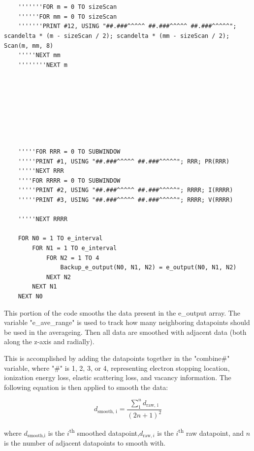 \documentclass[10pt, reqno]{exam}
\begin{document}
\begin{verbatim}
    
    
    '''''''FOR m = 0 TO sizeScan
    ''''''FOR mm = 0 TO sizeScan
    '''''''PRINT #12, USING "##.###^^^^^ ##.###^^^^^ ##.###^^^^^"; scandelta * (m - sizeScan / 2); scandelta * (mm - sizeScan / 2); Scan(m, mm, 8)
    '''''NEXT mm
    ''''''''NEXT m
    
    
    
    
    
    
    
    
    '''''FOR RRR = 0 TO SUBWINDOW
    '''''PRINT #1, USING "##.###^^^^^ ##.###^^^^^"; RRR; PR(RRR)
    '''''NEXT RRR
    ''''FOR RRRR = 0 TO SUBWINDOW
    '''''PRINT #2, USING "##.###^^^^^ ##.###^^^^^"; RRRR; I(RRRR)
    '''''PRINT #3, USING "##.###^^^^^ ##.###^^^^^"; RRRR; V(RRRR)
    
    '''''NEXT RRRR
    
    FOR N0 = 1 TO e_interval
        FOR N1 = 1 TO e_interval
            FOR N2 = 1 TO 4
                Backup_e_output(N0, N1, N2) = e_output(N0, N1, N2)
            NEXT N2
        NEXT N1
    NEXT N0
\end{verbatim}

This portion of the code smooths the data present in the e\_output array. The variable "e\_ave\_range" is used to track how many neighboring datapoints should be used in the averageing. Then all data are smoothed with adjacent data (both along the z-axis and radially). \par

This is accomplished by adding the datapoints together in the "combine\#" variable, where "\#" is 1, 2, 3, or 4, representing electron stopping location, ionization energy loss, elastic scattering loss, and vacancy information. The following equation is then applied to smooth the data:

\begin{equation}
    d_{\text{smooth, i}} = \frac{\sum_1^{n}d_{\text{raw, i}}}{(2n + 1)^2}
\end{equation}

where $d_{\text{smooth,i}}$ is the $i$\textsuperscript{th} smoothed datapoint,$d_{\text{raw}, i}$ is the $i$\textsuperscript{th} raw datapoint, and $n$ is the number of adjacent datapoints to smooth with.
\end{document}

